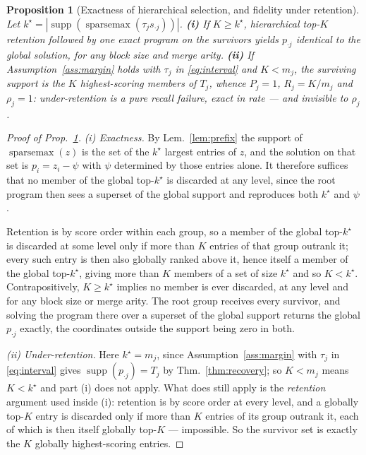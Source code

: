\documentclass{article}
\newtheorem{proposition}{Proposition}
\newcommand{\supp}{\operatorname{supp}}
\begin{document}
\begin{proposition}[Exactness of hierarchical selection, and fidelity under retention]
\label{prop:tournament}
Let $k^\star=|\supp(\operatorname{sparsemax}(\tau_j s_{\cdot j}))|$.
\textbf{(i)} If $K\ge k^\star$, hierarchical top-$K$ retention followed by one exact program on
the survivors yields $p_{\cdot j}$ identical to the global solution, for any block size and merge
arity. \textbf{(ii)} If Assumption~\ref{ass:margin} holds with $\tau_j$ in \eqref{eq:interval}
and $K<m_j$, the surviving support is the $K$ highest-scoring members of $T_j$, whence $P_j=1$,
$R_j=K/m_j$ and $\rho_j=1$: under-retention is a \emph{pure recall} failure, exact in rate ---
and invisible to $\rho_j$.
\end{proposition}

\begin{proof}[Proof of Prop.~\ref{prop:tournament}]
\emph{(i) Exactness.} By Lem.~\ref{lem:prefix} the support of $\operatorname{sparsemax}(z)$ is the set of the
$k^\star$ largest entries of $z$, and the solution on that set is $p_i = z_i - \psi$ with
$\psi$ determined by those entries alone. It therefore suffices that no member of the global
top-$k^\star$ is discarded at any level, since the root program then sees a superset of the
global support and reproduces both $k^\star$ and $\psi$.

Retention is by score order within each group, so a member of the global top-$k^\star$ is
discarded at some level only if more than $K$ entries of that group outrank it; every such
entry is then also globally ranked above it, hence itself a member of the global top-$k^\star$,
giving more than $K$ members of a set of size $k^\star$ and so $K < k^\star$. Contrapositively,
$K \geq k^\star$ implies no member is ever discarded, at any level and for any block size or
merge arity. The root group receives every survivor, and solving the program there over a
superset of the global support returns the global $p_{\cdot j}$ exactly, the coordinates
outside the support being zero in both.

\emph{(ii) Under-retention.} Here $k^\star = m_j$, since Assumption~\ref{ass:margin} with
$\tau_j$ in \eqref{eq:interval} gives $\supp(p_{\cdot j}) = T_j$ by Thm.~\ref{thm:recovery};
so $K<m_j$ means $K<k^\star$ and part (i) does not apply. What does still apply is the
\emph{retention} argument used inside (i): retention is by score order at every level, and a
globally top-$K$ entry is discarded only if more than $K$ entries of its group outrank it, each
of which is then itself globally top-$K$ --- impossible. So the survivor set is exactly the $K$
globally highest-scoring entries.


\end{proof}
\end{document}
